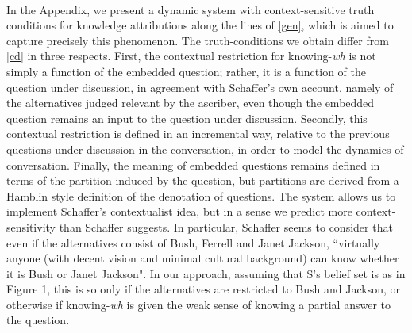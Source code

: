 \paragraph{}
In the Appendix, we present a dynamic system with
context-sensitive truth conditions for knowledge attributions
along the lines of \ref{gen}, which is aimed to capture precisely
this phenomenon. The truth-conditions we obtain differ from
\ref{cd} in three respects. First, the contextual restriction for
knowing-\emph{wh} is not simply a function of the embedded
question; rather, it is a function of the question under
discussion, in agreement with Schaffer's own account, namely of
the alternatives judged relevant by the ascriber, even though the
embedded question remains an input to the question under
discussion. Secondly, this contextual restriction is defined in an
incremental way, relative to the previous questions under
discussion in the conversation, in order to model the dynamics of
conversation. Finally, the meaning of embedded questions remains
defined in terms of the partition induced by the question, but
partitions are derived from a Hamblin style definition of the
denotation of questions. The system allows us to implement
Schaffer's contextualist idea, but in a sense we predict more
context-sensitivity than Schaffer suggests. In particular,
Schaffer seems to consider that even if the alternatives consist
of Bush, Ferrell and Janet Jackson, ``virtually anyone (with
decent vision and minimal cultural background) can know whether it
is Bush or Janet Jackson". In our approach, assuming that S's
belief set is as in Figure 1, this is so only if the alternatives
are restricted to Bush and Jackson, or otherwise if
knowing-\emph{wh} is given the weak sense of knowing a partial
answer to the question.